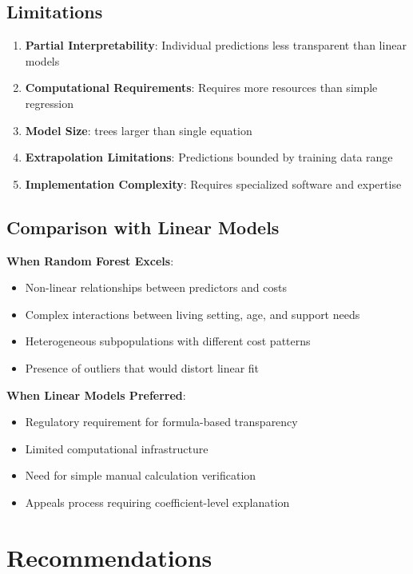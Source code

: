 \subsection{Limitations}

\begin{enumerate}
    \item \textbf{Partial Interpretability}: Individual predictions less transparent than linear models
    \item \textbf{Computational Requirements}: Requires more resources than simple regression
    \item \textbf{Model Size}: \ModelNineNTrees{} trees larger than single equation
    \item \textbf{Extrapolation Limitations}: Predictions bounded by training data range
    \item \textbf{Implementation Complexity}: Requires specialized software and expertise
\end{enumerate}

\subsection{Comparison with Linear Models}

\textbf{When Random Forest Excels}:
\begin{itemize}
    \item Non-linear relationships between predictors and costs
    \item Complex interactions between living setting, age, and support needs
    \item Heterogeneous subpopulations with different cost patterns
    \item Presence of outliers that would distort linear fit
\end{itemize}

\textbf{When Linear Models Preferred}:
\begin{itemize}
    \item Regulatory requirement for formula-based transparency
    \item Limited computational infrastructure
    \item Need for simple manual calculation verification
    \item Appeals process requiring coefficient-level explanation
\end{itemize}

\section{Recommendations}


